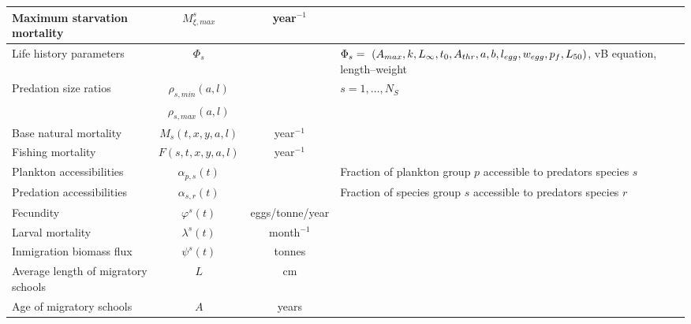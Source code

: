 \begin{table}
\begin{tabular}{|p{5cm}|c|c|p{5cm}|}
\hline Maximum starvation mortality& $M_{\xi,max}^s$ & year$^{-1}$ & \\	
\hline Life history parameters	& $\Phi_s$ && $\Phi_s =~(A_{max}, k, L_{\infty}, t_0, A_{thr}, \newline a, b, l_{egg}, w_{egg}, p_f, L_{50})$, \newline vB equation, length--weight\\
\hline Predation size ratios & $\rho_{s,min}(a,l)$ && $s = 1, \ldots, N_S$\\
& $\rho_{s,max}(a,l)$ && \\
\hline Base natural mortality & $M_s(t,x,y,a,l)$ & year$^{-1}$ & \\	
\hline Fishing mortality &	$F(s,t,x,y,a,l)$ & year$^{-1}$ & \\	
\hline Plankton accessibilities & $\alpha_{p,s}(t)$ && Fraction of plankton group $p$ accessible to predators species $s$ \\
\hline Predation accessibilities & $\alpha_{s,r}(t)$ && Fraction of species group $s$ accessible to predators species $r$ \\
\hline Fecundity & $\varphi^s(t)$ & eggs/tonne/year & \\
\hline Larval mortality & $\lambda^s(t)$ &  month$^{-1}$ & \\	
\hline Inmigration biomass flux & $\psi^s(t)$ & tonnes & \\	
\hline Average length of migratory schools	& $L$ & cm & \\	
\hline Age of migratory schools & $A$ & years & \\	
\hline
\end{tabular} 
\end{table}



